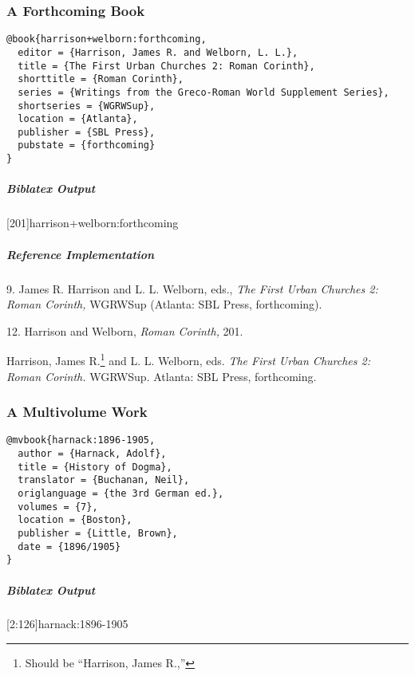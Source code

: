 \documentclass[a4paper]{article}
\newenvironment{biboutput}{%
  \subparagraph{Biblatex Output}
}{\color{black}}
\newenvironment{refimp}{%
  \subparagraph{Reference Implementation}
  \color{reference-colour}
  \rm
}{\par\color{black}}
\begin{document}
\subsubsection{A Forthcoming Book}

\begin{lstlisting}
@book{harrison+welborn:forthcoming,
  editor = {Harrison, James R. and Welborn, L. L.},
  title = {The First Urban Churches 2: Roman Corinth},
  shorttitle = {Roman Corinth},
  series = {Writings from the Greco-Roman World Supplement Series},
  shortseries = {WGRWSup},
  location = {Atlanta},
  publisher = {SBL Press},
  pubstate = {forthcoming}
}
\end{lstlisting}

\begin{biboutput}
  [201]{harrison+welborn:forthcoming}
\end{biboutput}

\begin{refimp}
  9. James R. Harrison and L. L. Welborn, eds., \emph{The First Urban Churches
  2: Roman Corinth,} WGRWSup (Atlanta: SBL Press, forthcoming).

  12. Harrison and Welborn, \emph{Roman Corinth,} 201.

  \hangindent\bibindent Harrison, James R.\footnote{Should be “Harrison, James
  R.,”} and L. L. Welborn, eds. \emph{The First Urban Churches 2: Roman
  Corinth.} WGRWSup. Atlanta: SBL Press, forthcoming.

\end{refimp}

\subsubsection{A Multivolume Work}

\begin{lstlisting}
@mvbook{harnack:1896-1905,
  author = {Harnack, Adolf},
  title = {History of Dogma},
  translator = {Buchanan, Neil},
  origlanguage = {the 3rd German ed.},
  volumes = {7},
  location = {Boston},
  publisher = {Little, Brown},
  date = {1896/1905}
}
\end{lstlisting}  

\begin{biboutput}
  [2:126]{harnack:1896-1905}
\end{biboutput}
\end{document}
